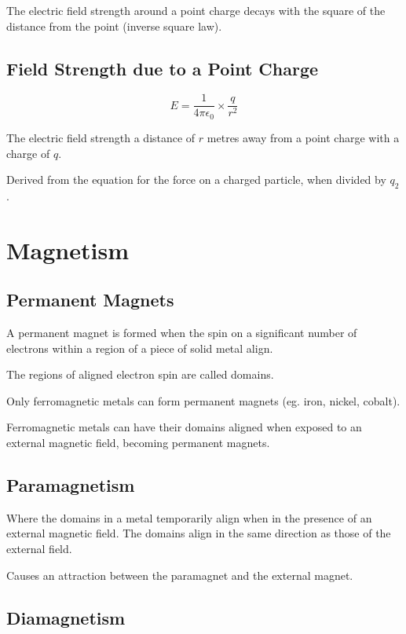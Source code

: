 \documentclass[a4paper,11pt]{article}
\begin{document}
The electric field strength around a point charge decays with the square of
the distance from the point (inverse square law).


\subsection{Field Strength due to a Point Charge}

$$
E = \frac{1}{4\pi \epsilon_0} \times \frac{q}{r^2}
$$

The electric field strength a distance of $r$ metres away from a point charge
with a charge of $q$.

Derived from the equation for the force on a charged particle, when divided by
$q_2$.




\section{Magnetism}

\subsection{Permanent Magnets}

A permanent magnet is formed when the spin on a significant number of
electrons within a region of a piece of solid metal align.

The regions of aligned electron spin are called domains.

Only ferromagnetic metals can form permanent magnets (eg. iron, nickel,
cobalt).

Ferromagnetic metals can have their domains aligned when exposed to an external
magnetic field, becoming permanent magnets.


\subsection{Paramagnetism}

Where the domains in a metal temporarily align when in the presence of an
external magnetic field.
The domains align in the same direction as those of the external field.

Causes an attraction between the paramagnet and the external magnet.


\subsection{Diamagnetism}
\end{document}
